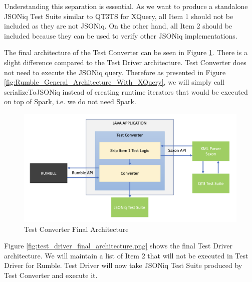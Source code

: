 Understanding this separation is essential. As we want to produce a standalone JSONiq Test Suite similar to QT3TS for XQuery, all Item 1 should not be included as they are not JSONiq. On the other hand, all Item 2 should be included because they can be used to verify other JSONiq implementations. 

The final architecture of the Test Converter can be seen in Figure \ref{fig:test_converter_final_architecture.png}. There is a slight difference compared to the Test Driver architecture. Test Converter does not need to execute the JSONiq query. Therefore as presented in Figure \ref{fig:Rumble_General_Architecture_With_XQuery}, we will simply call serializeToJSONiq instead of creating runtime iterators that would be executed on top of Spark, i.e. we do not need Spark. 

\begin{figure}[h!]
	\vspace*{-5mm}
	\includegraphics[width=\linewidth]{test_converter_final_architecture.png}
	\vspace*{-8mm}
	\caption{Test Converter Final Architecture}
	\label{fig:test_converter_final_architecture.png}
\end{figure}

\vspace*{-4mm}
Figure \ref{fig:test_driver_final_architecture.png} shows the final Test Driver architecture. We will maintain a list of Item 2 that will not be executed in Test Driver for Rumble. Test Driver will now take JSONiq Test Suite produced by Test Converter and execute it. 

